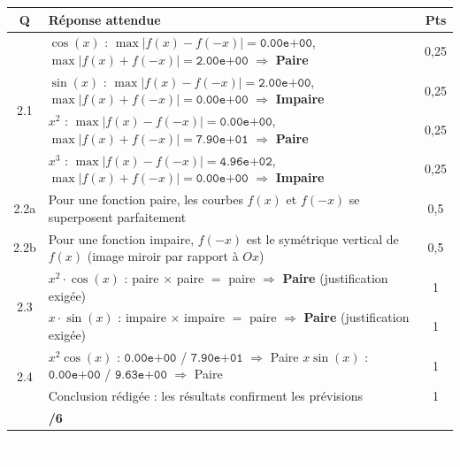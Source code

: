 \documentclass[10pt,a4paper]{article}
\newcommand{\exotitle}[2]{%
  \noindent\colorbox{exoheader}{%
    \parbox{\dimexpr\linewidth-2\fboxsep\relax}{%
      \textcolor{white}{\textbf{\large #1 \hfill #2}}%
    }%
  }%
}
\begin{document}
\begin{tabularx}{\linewidth}{|c|X|c|}
	\hline
	\rowcolor{exolight}
	\textbf{Q} & \textbf{Réponse attendue} & \textbf{Pts} \\
	\hline
	\multirow{4}{*}{2.1} & $\cos(x)$ : $\max|f(x)-f(-x)| = \texttt{0.00e+00}$, $\max|f(x)+f(-x)| = \texttt{2.00e+00}$ $\Rightarrow$ \textbf{Paire} & 0,25 \\
	\cline{2-3}
	& $\sin(x)$ : $\max|f(x)-f(-x)| = \texttt{2.00e+00}$, $\max|f(x)+f(-x)| = \texttt{0.00e+00}$ $\Rightarrow$ \textbf{Impaire} & 0,25 \\
	\cline{2-3}
	& $x^2$ : $\max|f(x)-f(-x)| = \texttt{0.00e+00}$, $\max|f(x)+f(-x)| = \texttt{7.90e+01}$ $\Rightarrow$ \textbf{Paire} & 0,25 \\
	\cline{2-3}
	& $x^3$ : $\max|f(x)-f(-x)| = \texttt{4.96e+02}$, $\max|f(x)+f(-x)| = \texttt{0.00e+00}$ $\Rightarrow$ \textbf{Impaire} & 0,25 \\
	\hline
	2.2a & Pour une fonction paire, les courbes $f(x)$ et $f(-x)$ se superposent parfaitement & 0,5 \\
	\hline
	2.2b & Pour une fonction impaire, $f(-x)$ est le symétrique vertical de $f(x)$ (image miroir par rapport à $Ox$) & 0,5 \\
	\hline
	\multirow{2}{*}{2.3} & $x^2 \cdot \cos(x)$ : paire $\times$ paire $=$ paire \quad $\Rightarrow$ \textbf{Paire} (justification exigée) & 1 \\
	\cline{2-3}
	& $x \cdot \sin(x)$ : impaire $\times$ impaire $=$ paire \quad $\Rightarrow$ \textbf{Paire} (justification exigée) & 1 \\
	\hline
	\multirow{2}{*}{2.4} & $x^2\cos(x)$ : $\texttt{0.00e+00}$ / $\texttt{7.90e+01}$ $\Rightarrow$ Paire \quad $x\sin(x)$ : $\texttt{0.00e+00}$ / $\texttt{9.63e+00}$ $\Rightarrow$ Paire & 1 \\
	\cline{2-3}
	& Conclusion rédigée : les résultats confirment les prévisions & 1 \\
	\hline
	\rowcolor{totalrow}
	\multicolumn{2}{|r|}{\textbf{Sous-total Exercice 2}} & \textbf{/6} \\
	\hline
\end{tabularx}

\vspace{3mm}

\exotitle{Exercice 3 : Décomposition paire + impaire}{/5 pts}

\vspace{1mm}
\end{document}
